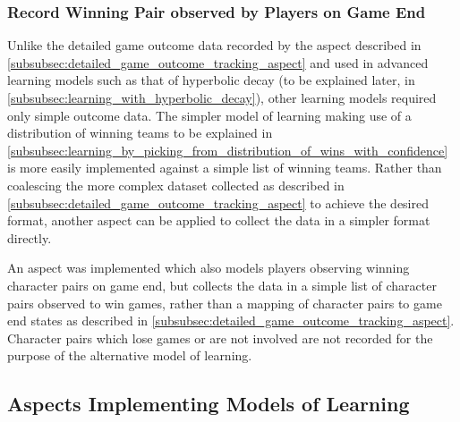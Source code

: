 \subsubsection{Record Winning Pair observed by Players on Game End}\label{subsubsec:aspect_to_observe_winning_pair}
Unlike the detailed game outcome data recorded by the aspect described in \cref{subsubsec:detailed_game_outcome_tracking_aspect} and used
in advanced learning models such as that of hyperbolic decay (to be explained later, in \cref{subsubsec:learning_with_hyperbolic_decay}),
other learning models required only simple outcome data. The simpler model of learning making use of
a distribution of winning teams to be explained in \cref{subsubsec:learning_by_picking_from_distribution_of_wins_with_confidence}
is more easily implemented against a simple list of winning teams. Rather than coalescing the more complex dataset collected as described in
\cref{subsubsec:detailed_game_outcome_tracking_aspect} to achieve the desired format, another aspect can be applied
to collect the data in a simpler format directly.

An aspect was implemented which also models players observing winning character pairs on game end, but collects the data in a
simple list of character pairs observed to win games, rather than a mapping of character pairs to game end states as described in
\cref{subsubsec:detailed_game_outcome_tracking_aspect}. Character pairs which lose games or are not involved are not recorded for the purpose
of the alternative model of learning.

\subsection{Aspects Implementing Models of Learning}\label{subsec:aspects_modelling_learning}


